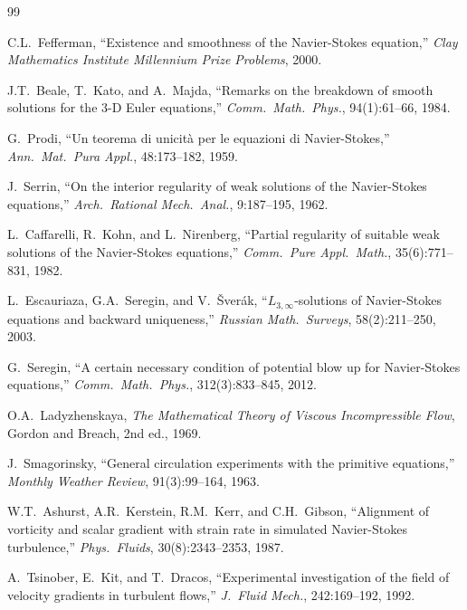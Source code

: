 \documentclass[12pt, a4paper]{article}
\begin{document}
\begin{thebibliography}{99}

C.L.~Fefferman,
``Existence and smoothness of the Navier-Stokes equation,''
\emph{Clay Mathematics Institute Millennium Prize Problems}, 2000.

J.T.~Beale, T.~Kato, and A.~Majda,
``Remarks on the breakdown of smooth solutions for the
3-D Euler equations,''
\emph{Comm.\ Math.\ Phys.}, 94(1):61--66, 1984.

G.~Prodi,
``Un teorema di unicit\`{a} per le equazioni di Navier-Stokes,''
\emph{Ann.\ Mat.\ Pura Appl.}, 48:173--182, 1959.

J.~Serrin,
``On the interior regularity of weak solutions of the
Navier-Stokes equations,''
\emph{Arch.\ Rational Mech.\ Anal.}, 9:187--195, 1962.

L.~Caffarelli, R.~Kohn, and L.~Nirenberg,
``Partial regularity of suitable weak solutions of the
Navier-Stokes equations,''
\emph{Comm.\ Pure Appl.\ Math.}, 35(6):771--831, 1982.

L.~Escauriaza, G.A.~Seregin, and V.~\v{S}ver\'{a}k,
``$L_{3,\infty}$-solutions of Navier-Stokes equations and
backward uniqueness,''
\emph{Russian Math.\ Surveys}, 58(2):211--250, 2003.

G.~Seregin,
``A certain necessary condition of potential blow up for
Navier-Stokes equations,''
\emph{Comm.\ Math.\ Phys.}, 312(3):833--845, 2012.

O.A.~Ladyzhenskaya,
\emph{The Mathematical Theory of Viscous Incompressible Flow},
Gordon and Breach, 2nd ed., 1969.

J.~Smagorinsky,
``General circulation experiments with the primitive equations,''
\emph{Monthly Weather Review}, 91(3):99--164, 1963.

W.T.~Ashurst, A.R.~Kerstein, R.M.~Kerr, and C.H.~Gibson,
``Alignment of vorticity and scalar gradient with strain rate
in simulated Navier-Stokes turbulence,''
\emph{Phys.\ Fluids}, 30(8):2343--2353, 1987.

A.~Tsinober, E.~Kit, and T.~Dracos,
``Experimental investigation of the field of velocity gradients
in turbulent flows,''
\emph{J.\ Fluid Mech.}, 242:169--192, 1992.


\end{thebibliography}
\end{document}
